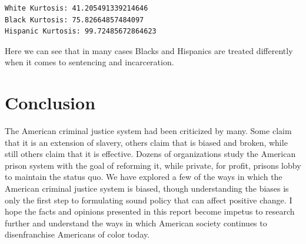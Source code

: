 \documentclass[11pt]{article}
\begin{document}
    \begin{Verbatim}[commandchars=\\\{\}]
White Kurtosis: 41.205491339214646
Black Kurtosis: 75.82664857484097
Hispanic Kurtosis: 99.72485672864623

    \end{Verbatim}

    Here we can see that in many cases Blacks and Hispanics are treated
differently when it comes to sentencing and incarceration.

    \hypertarget{conclusion}{%
\section{Conclusion}\label{conclusion}}

The American criminal justice system had been criticized by many. Some
claim that it is an extension of slavery, others claim that is biased
and broken, while still others claim that it is effective\cite{eji}. Dozens of
organizations study the American prison system with the goal of
reforming it, while private, for profit, prisons lobby to maintain the
status quo. We have explored a few of the ways in which the American
criminal justice system is biased, though understanding the biases is
only the first step to formulating sound policy that can affect positive
change. I hope the facts and opinions presented in this report become
impetus to research further and understand the ways in which American
society continues to disenfranchise Americans of color today.


\pagebreak

\nocite{*}
\printbibliography
    
\end{document}
